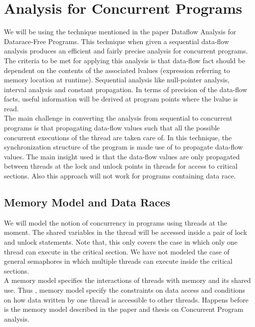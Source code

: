 \chapter{Analysis for Concurrent Programs}

We will be using the technique mentioned in the paper Dataflow Analysis for Datarace-Free Programs. This technique when given a sequential data-flow analysis produces an efficient and fairly precise analysis for concurrent programs. The criteria to be met for applying this analysis is that data-flow fact should  be dependent on the contents of the associated lvalues (expression referring to memory location at runtime). Sequential analysis like null-pointer analysis, interval analysis and constant propagation. In terms of precision of the data-flow facts, useful information will be derived at program points where the lvalue is read.\cite{Arnab2006} \\

The main challenge in converting the analysis from sequential to concurrent programs is that propagating data-flow values such that all the possible concurrent executions of the thread are taken care of. In this technique, the synchronization structure of the program is made use of to propagate data-flow values. The main insight used is that the data-flow values are only propagated between threads at the lock and unlock points in threads for access to critical sections. Also this approach will not work for programs containing data race. \\

\section{Memory Model and Data Races}

We will model the notion of concurrency in programs using threads at the moment. The shared variables in the thread will be accessed inside a pair of lock and unlock statements. Note that, this only covers the case in which only one thread can execute in the critical section. We have not modeled the case of general semaphores in which multiple threads can execute inside the critical sections. \\

A memory model specifies the interactions of threads with memory and its shared use. Thus , memory model specify the constraints on data access and conditions on how data written by one thread is accessible to other threads. Happens before is the memory model described in the paper and thesis on Concurrent Program analysis. \\ 


